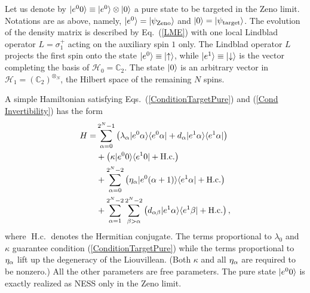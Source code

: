 \documentclass[aps,pra,letterpaper,twocolumn,showpacs,superscriptaddress,floatfix,longbibliography]{revtex4-1}
\newcommand{\hc}{\mathop{\mathrm{H.c.}}\limits}
\begin{document}
Let us denote by $|{e^{0}0}\rangle\equiv|{e^0}\rangle\otimes|{0}\rangle$ a pure
state to be targeted in the Zeno limit.  Notations are as above,
namely, $|{e^0}\rangle=|{\psi_\mathrm{Zeno}}\rangle$ and
$|{0}\rangle=|{\psi_\mathrm{target}}\rangle$.  The evolution of the density
matrix is described by Eq.~(\ref{LME}) with one local Lindblad
operator $L=\sigma_1^{+}$ acting
on the auxiliary spin $1$ only.  The Lindblad operator $L$ projects
the first spin onto the state $|{e^{0}}\rangle\equiv|{\uparrow}\rangle$, while
$|{e^{1}}\rangle \equiv |{\downarrow}\rangle$ is the vector completing the
basis of $\mathcal{H}_0 = \mathbb{C}_2$.  The state $|{0}\rangle$ is an
arbitrary vector in $\mathcal{H}_1 =
\left(\mathbb{C}_2\right)^{\otimes_N}$, the Hilbert space of the
remaining $N$ spins.

A simple Hamiltonian satisfying Eqs.~(\ref{ConditionTargetPure}) and
(\ref{Cond Invertibility}) has the form
\begin{align}
  H =& \sum_{\al=0}^{2^{N}-1} \left( \lambda_\alpha
    \ket{e^{0}\al}\bra{e^{0}\al} + d_\al \ket{e^{1}\al}\bra{e^{1}\al}
  \right) \nonumber\\ &+
  \left( \kappa\ket{e^{0}0}\bra{e^{1}0}+\hc\right)\nonumber\\
  &+\sum_{\al=0}^{2^{N}-2} \left(
    \eta_{\al}\ket{e^{0}(\al+1)}\bra{e^{1}\al}+\hc \right)
  \nonumber\\ &+\sum_{\al=1}^{2^{N}-2} \sum_{\be>\al}^{2^{N}-2}
  \left( d_{\al\be}\ket{e^{1}\al}\bra{e^{1}\be}+\hc\right),
  \label{ManyQubitsHamiltonian}%
\end{align}
where $\hc$ denotes the Hermitian conjugate. The terms proportional to
$\lambda_0$ and $\kappa$ guarantee condition
(\ref{ConditionTargetPure}) while the terms proportional to
$\eta_{\alpha}$ lift up the degeneracy of the Liouvillean. (Both $\kappa$
and all $\eta_{\alpha}$ are required to be nonzero.) All the other
parameters are free parameters.  The pure state $|{e^{0}0}\rangle$ is
exactly realized as NESS only in the Zeno limit.
\end{document}
